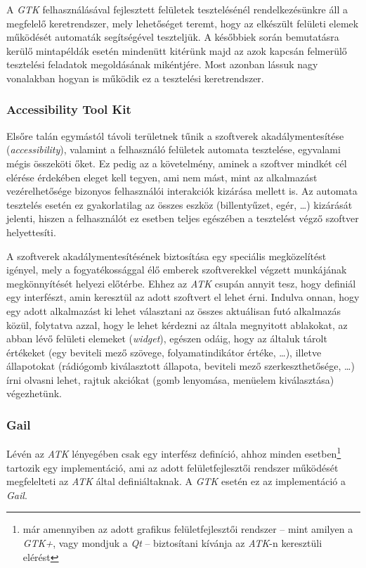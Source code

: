 A \textit{GTK} felhasználásával fejlesztett felületek tesztelésénél rendelkezésünkre áll a megfelelő keretrendszer, mely lehetőséget teremt, hogy az elkészült felületi elemek működését automaták segítségével teszteljük. A későbbiek során bemutatásra kerülő mintapéldák esetén mindenütt kitérünk majd az azok kapcsán felmerülő tesztelési feladatok megoldásának mikéntjére. Most azonban lássuk nagy vonalakban hogyan is működik ez a tesztelési keretrendszer.

\subsubsection{Accessibility Tool Kit}

Elsőre talán egymástól távoli területnek tűnik a szoftverek akadálymentesítése (\textit{accessibility}), valamint a felhasználó felületek automata tesztelése, egyvalami mégis összeköti őket. Ez pedig az a követelmény, aminek a szoftver mindkét cél elérése érdekében eleget kell tegyen, ami nem mást, mint az alkalmazást vezérelhetősége bizonyos felhasználói interakciók kizárása mellett is. Az automata tesztelés esetén ez gyakorlatilag az összes eszköz (billentyűzet, egér, \dots) kizárását jelenti, hiszen a felhasználót ez esetben teljes egészében a tesztelést végző szoftver helyettesíti.

A szoftverek akadálymentesítésének biztosítása egy speciális megközelítést igényel, mely a fogyatékossággal élő emberek szoftverekkel végzett munkájának megkönnyítését helyezi előtérbe. Ehhez az \textit{ATK} csupán annyit tesz, hogy definiál egy interfészt, amin keresztül az adott szoftvert el lehet érni. Indulva onnan, hogy egy adott alkalmazást ki lehet választani az összes aktuálisan futó alkalmazás közül, folytatva azzal, hogy le lehet kérdezni az általa megnyitott ablakokat, az abban lévő felületi elemeket (\textit{widget}), egészen odáig, hogy az általuk tárolt értékeket (egy beviteli mező szövege, folyamatindikátor értéke, \dots), illetve állapotokat (rádiógomb kiválasztott állapota, beviteli mező szerkeszthetősége, \dots) írni olvasni lehet, rajtuk akciókat (gomb lenyomása, menüelem kiválasztása) végezhetünk.

\subsubsection{Gail}
\label{sec:gail}

Lévén az \textit{ATK} lényegében csak egy interfész definíció, ahhoz minden esetben\footnote{már amennyiben az adott grafikus felületfejlesztői rendszer -- mint amilyen a \textit{GTK+}, vagy mondjuk a \textit{Qt} -- biztosítani kívánja az \textit{ATK}-n keresztüli elérést} tartozik egy implementáció, ami az adott felületfejlesztői rendszer működését megfelelteti az \textit{ATK} által definiáltaknak. A \textit{GTK}  esetén ez az implementáció a \textit{Gail}.

